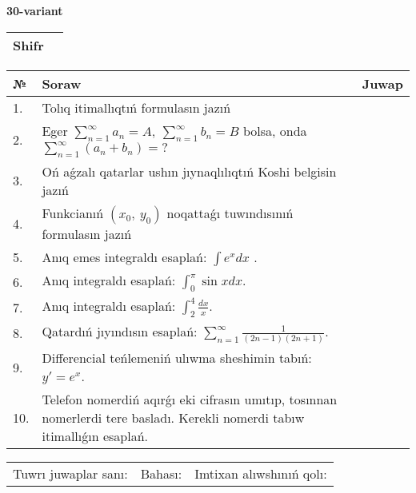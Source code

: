 \documentclass{article}
\begin{document}
  \egroup
  
  \newpage
  
  
  \textbf{30-variant}\\
  
  \bgroup
  \def\arraystretch{1.6} %
  
  \begin{tabular}{|m{5.7cm}|m{9.5cm}|}
  \hline
  Shifr & \\
  \hline
  \end{tabular}
  
  \vspace{1cm}
  
  \begin{tabular}{|m{0.7cm}|m{10cm}|m{4cm}|}
  \hline
  № & Soraw & Juwap \\
  \hline
  1. & Tolıq itimallıqtıń formulasın jazıń &  \\
  \hline
  2. & Eger \(\sum_{n = 1}^{\infty}a_{n} = A,\ \sum_{n = 1}^{\infty}b_{n} = B\) bolsa, onda \(\sum_{n = 1}^{\infty}\left( a_{n} + b_{n} \right) = ?\) &  \\
  \hline
  3. & Oń aǵzalı qatarlar ushın jıynaqlılıqtıń Koshi belgisin jazıń &  \\
  \hline
  4. & Funkcianıń \((x_{0},\ y_{0})\) noqattaǵı tuwındısınıń formulasın jazıń &  \\
  \hline
  5. & Anıq emes integraldı esaplań: \(\int{e^{x}dx}\) . &  \\
  \hline
  6. & Anıq integraldı esaplań: \(\int_{0}^{\pi}{\sin xdx}\). &  \\
  \hline
  7. & Anıq integraldı esaplań: \(\int_{2}^{4}\frac{dx}{x}\). &  \\
  \hline
  8. & Qatardıń jıyındısın esaplań: \(\sum_{n = 1}^{\infty}\frac{1}{(2n - 1)(2n + 1)}\). &  \\
  \hline
  9. & Differencial teńlemeniń ulıwma sheshimin tabıń: \(y' = e^{x}\). &  \\
  \hline
  10. & Telefon nomerdiń aqırǵı eki cifrasın umıtıp, tosınnan nomerlerdi tere basladı. Kerekli nomerdi tabıw itimallıǵın esaplań. &  \\
  \hline
  \end{tabular}
  
  \vspace{1cm}
  
  \begin{tabular}{lll}
  Tuwrı juwaplar sanı: \underline{\hspace{1.5cm}} & 
  Bahası: \underline{\hspace{1.5cm}} & 
  Imtixan alıwshınıń qolı: \underline{\hspace{2cm}} \\
  \end{tabular}
  
\end{document}
